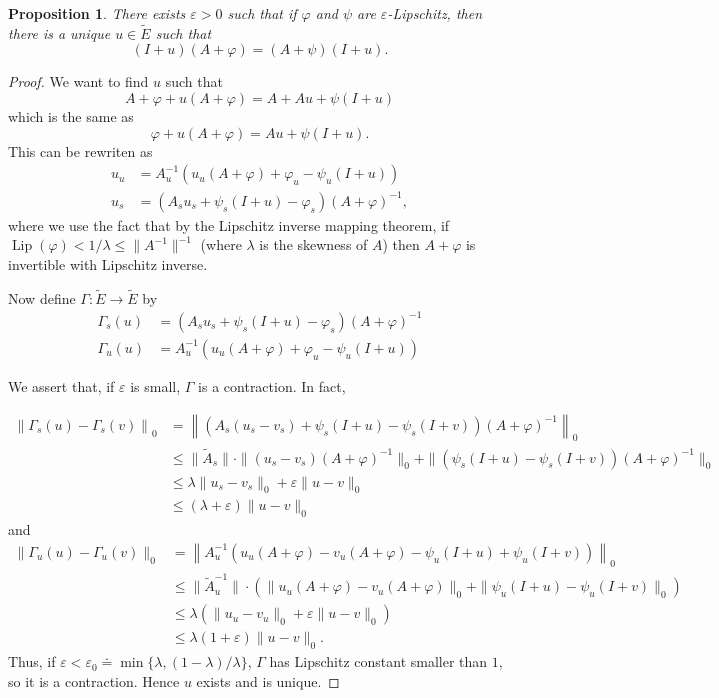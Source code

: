 \documentclass[12pt]{article}
\newcommand{\lip}{\operatorname{Lip}}
\newtheorem{proposition}{Proposition}
\renewcommand{\phi}{\varphi}
\renewcommand{\epsilon}{\varepsilon}
\begin{document}
\begin{proposition} There exists $\epsilon>0$ such that if $\phi$ and $\psi$ are $\epsilon$-Lipschitz,
then there is a unique $u\in \tilde E$ such that
$$(I+u)(A+\phi) = (A+\psi)(I+u).$$
\end{proposition}
\begin{proof}
We want to find $u$ such that
$$A+\phi + u(A+\phi) = A + Au + \psi(I+u)$$
which is the same as
$$\phi + u(A+\phi) = Au + \psi(I+u).$$
This can be rewriten as
\begin{align*}
u_u &=  A_u^{-1}(u_u(A+\phi) + \phi_u - \psi_u(I+u))\\
u_s &= (A_su_s + \psi_s(I+u) - \phi_s)(A+\phi)^{-1},
\end{align*}
where we use the fact that by the Lipschitz inverse mapping theorem, if $\lip(\phi)<1/\lambda \leq \|A^{-1}\|^{-1}$
(where $\lambda$ is the skewness of $A$) then $A+\phi$ is invertible with Lipschitz inverse.

Now define $\Gamma:\tilde E\to \tilde E$ by
\begin{align*}
\Gamma_s(u) &= ( A_su_s + \psi_s(I+u) - \phi_s)(A+\phi)^{-1} \\
\Gamma_u(u) &= A_u^{-1}(u_u(A+\phi) + \phi_u - \psi_u(I+u))
\end{align*}

We assert that, if $\epsilon$ is small, $\Gamma$ is a contraction.
In fact,

\begin{align*}
\left\|\Gamma_s(u) - \Gamma_s(v)\right\|_0 &= \left\|\left(A_s(u_s-v_s) + \psi_s(I+u) -
\psi_s(I+v)\right)(A+\phi)^{-1}\right\|_0 \\
&\leq \|\tilde A_s\|\cdot\|(u_s-v_s)(A+\phi)^{-1}\|_0 + \|(\psi_s(I+u) -
\psi_s(I+v))(A+\phi)^{-1}\|_0 \\
&\leq \lambda\|u_s-v_s\|_0 + \epsilon\|u-v\|_0\\
&\leq (\lambda+\epsilon) \|u-v\|_0
\end{align*}
and
\begin{align*}
\|\Gamma_u(u)-\Gamma_u(v)\|_0 &= \left\|A_u^{-1}(u_u(A+\phi) - v_u(A+\phi) - \psi_u(I+u) +
\psi_u(I+v))\right\|_0 \\
        &\leq \|\tilde A_u^{-1}\|\cdot\left( \|u_u(A+\phi)-v_u(A+\phi)\|_0 +
        \|\psi_u(I+u) - \psi_u(I+v)\|_0\right) \\
        &\leq \lambda \left( \|u_u - v_u\|_0 + \epsilon \|u - v\|_0 \right)\\
        &\leq \lambda(1 + \epsilon)\|u-v\|_0.
\end{align*}
Thus, if $\epsilon < \epsilon_0 \doteq \min\{\lambda, (1-\lambda)/\lambda\}$, $\Gamma$ has Lipschitz constant
smaller than $1$, so it is a contraction. Hence $u$ exists and is unique.
\end{proof}
\end{document}
